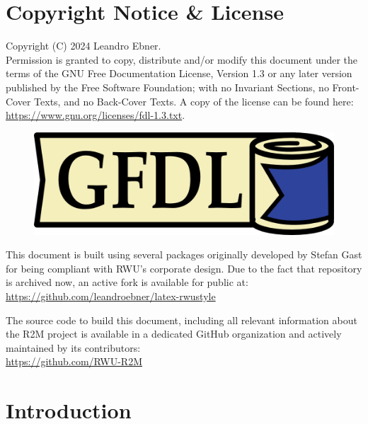 \section{Copyright Notice \& License}

    Copyright (C)  2024 Leandro Ebner. \\
    Permission is granted to copy, distribute and/or modify this document under the terms of the GNU Free Documentation License, Version 1.3 or any later version published by the Free Software Foundation; with no Invariant Sections, no Front-Cover Texts, and no Back-Cover Texts. A copy of the license can be found here:
    \href{https://www.gnu.org/licenses/fdl-1.3.txt}{https://www.gnu.org/licenses/fdl-1.3.txt}.

    \begin{figure}[h!] %
        \includegraphics{contents/figures/gfdl-logo.png}
    \end{figure}

    \vspace{5mm} %
    
    This document is built using several packages originally developed by Stefan Gast for being compliant with RWU's corporate design. Due to the fact that repository is archived now, an active fork is available for public at: \\
    \href{https://github.com/leandroebner/latex-rwustyle}{https://github.com/leandroebner/latex-rwustyle} 

    The source code to build this document, including all relevant information about the R2M project is available in a dedicated GitHub organization and actively maintained by its contributors: \\
    \href{https://github.com/RWU-R2M}{https://github.com/RWU-R2M}

\section{Introduction}

